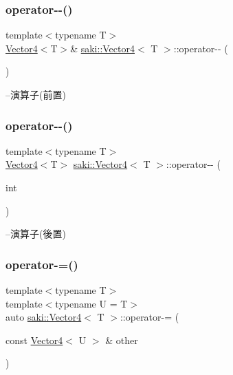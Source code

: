 \subsubsection{\texorpdfstring{operator-\/-\/()}{operator--()}\hspace{0.1cm}{\footnotesize\ttfamily [1/2]}}
{\footnotesize\ttfamily template$<$typename T$>$ \\
\mbox{\hyperlink{classsaki_1_1_vector4}{Vector4}}$<$T$>$\& \mbox{\hyperlink{classsaki_1_1_vector4}{saki\+::\+Vector4}}$<$ T $>$\+::operator-\/-\/ (\begin{DoxyParamCaption}{ }\end{DoxyParamCaption})\hspace{0.3cm}{\ttfamily [inline]}}



--演算子(前置) 

\mbox{\label{classsaki_1_1_vector4_a4c92f3d34650bdd0c29729c6316cafc1}} 
\subsubsection{\texorpdfstring{operator-\/-\/()}{operator--()}\hspace{0.1cm}{\footnotesize\ttfamily [2/2]}}
{\footnotesize\ttfamily template$<$typename T$>$ \\
\mbox{\hyperlink{classsaki_1_1_vector4}{Vector4}}$<$T$>$ \mbox{\hyperlink{classsaki_1_1_vector4}{saki\+::\+Vector4}}$<$ T $>$\+::operator-\/-\/ (\begin{DoxyParamCaption}\item[{int}]{ }\end{DoxyParamCaption})\hspace{0.3cm}{\ttfamily [inline]}}



--演算子(後置) 

\mbox{\label{classsaki_1_1_vector4_ac5fcc0547c4ed1a6606b804438a1ebcb}} 
\subsubsection{\texorpdfstring{operator-\/=()}{operator-=()}}
{\footnotesize\ttfamily template$<$typename T$>$ \\
template$<$typename U  = T$>$ \\
auto \mbox{\hyperlink{classsaki_1_1_vector4}{saki\+::\+Vector4}}$<$ T $>$\+::operator-\/= (\begin{DoxyParamCaption}\item[{const \mbox{\hyperlink{classsaki_1_1_vector4}{Vector4}}$<$ U $>$ \&}]{other }\end{DoxyParamCaption})\hspace{0.3cm}{\ttfamily [inline]}}



